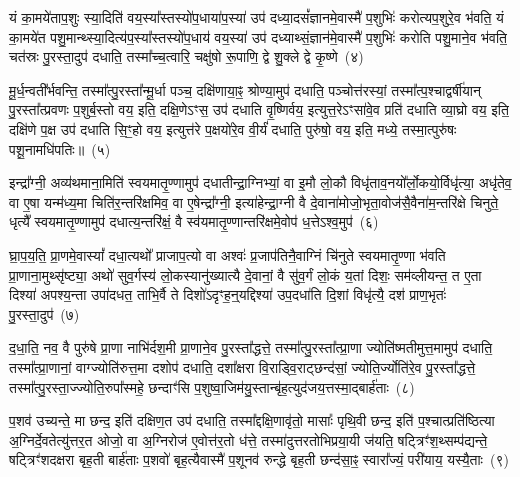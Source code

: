 यं का॒मये॑ताप॒शुः स्या॒दिति॑ वय॒स्या᳚स्तस्यो॑प॒धाया॑प॒स्या॑ उप॑ दध्या॒दसं᳚ज्ञानमे॒वास्मै॑ प॒शुभिः॑ करोत्यप॒शुरे॒व भ॑वति॒ यं का॒मये॑त पशु॒मान्थ्स्या॒दित्य॑प॒स्या᳚स्तस्यो॑प॒धाय॑ वय॒स्या॑ उप॑ दध्याथ्सं॒ज्ञान॑मे॒वास्मै॑ प॒शुभिः॑ करोति पशु॒माने॒व भ॑वति॒ चत॑स्रः पु॒रस्ता॒दुप॑ दधाति॒ तस्मा᳚च्च॒त्वारि॒ चक्षु॑षो रू॒पाणि॒ द्वे शु॒क्ले द्वे कृ॒ष्णे~(४)

मू॒र्ध॒न्वती᳚र्भवन्ति॒ तस्मा᳚त्पु॒रस्ता᳚न्मू॒र्धा पञ्च॒ दक्षि॑णाया॒ꣴ॒ श्रोण्या॒मुप॑ दधाति॒ पञ्चोत्त॑रस्यां॒ तस्मा᳚त्प॒श्चाद्वर्\mbox{}षी॑यान् पु॒रस्ता᳚त्प्रवणः प॒शुर्ब॒स्तो वय॒ इति॒ दक्षि॒णे\-ऽꣳस॒ उप॑ दधाति वृ॒ष्णिर्वय॒ इत्युत्त॒रे\-ऽꣳसा॑वे॒व प्रति॑ दधाति व्या॒घ्रो वय॒ इति॒ दक्षि॑णे प॒क्ष उप॑ दधाति सि॒ꣳ॒हो वय॒ इत्युत्त॑रे प॒क्षयो॑रे॒व वी॒र्यं॑ दधाति॒ पुरु॑षो॒ वय॒ इति॒ मध्ये॒ तस्मा॒त्पुरु॑षः पशू॒नामधि॑पतिः॥~(५)

{\anuvakamend[{कॢप्त्या॑ उप॒धाय॑ प्राण॒भृतः॒ सम॑नसः कृ॒ष्णे पुरु॑षो॒ वय॒ इति॒ पञ्च॑ च}]}%

इन्द्रा᳚ग्नी॒ अव्य॑थमाना॒मिति॑ स्वयमातृ॒ण्णामुप॑ दधातीन्द्रा॒ग्निभ्यां॒ वा इ॒मौ लो॒कौ विधृ॑ताव॒नयो᳚र्लो॒कयो॒र्विधृ॑त्या॒ अधृ॑तेव॒ वा ए॒षा यन्म॑ध्य॒मा चिति॑र॒न्तरि॑क्षमिव॒ वा ए॒षेन्द्रा᳚ग्नी॒ इत्या॑हेन्द्रा॒ग्नी वै दे॒वाना॑मोजो॒भृता॒वोज॑सै॒वैना॑\-म॒न्तरि॑क्षे चिनुते॒ धृत्यै᳚ स्वयमातृ॒ण्णामुप॑ दधात्य॒न्तरि॑क्षं॒ वै स्व॑यमातृ॒ण्णान्तरि॑क्षमे॒वोप॑ ध॒त्ते\-ऽश्व॒मुप॑~(६)

घ्रा॒प॒य॒ति॒ प्रा॒णमे॒वास्यां᳚ दधा॒त्यथो᳚ प्राजाप॒त्यो वा अश्वः॑ प्र॒जाप॑तिनै॒वाग्निं चि॑नुते स्वयमातृ॒ण्णा भ॑वति प्रा॒णाना॒मुथ्सृ॑ष्ट्या॒ अथो॑ सुव॒र्गस्य॑ लो॒कस्यानु॑ख्यात्यै दे॒वानां॒ वै सु॑व॒र्गं लो॒कं य॒तां दिशः॒ सम॑व्लीयन्त॒ त ए॒ता दिश्या॑ अपश्य॒न्ता उपा॑दधत॒ ताभि॒र्वै ते दिशो॑\-ऽदृꣳह॒न्॒यद्दिश्या॑ उप॒दधा॑ति दि॒शां विधृ॑त्यै॒ दश॑ प्राण॒भृतः॑ पु॒रस्ता॒दुप॑~(७)

द॒धा॒ति॒ नव॒ वै पुरु॑षे प्रा॒णा नाभि॑र्दश॒मी प्रा॒णाने॒व पु॒रस्ता᳚द्धत्ते॒ तस्मा᳚त्पु॒रस्ता᳚त्प्रा॒णा ज्योति॑ष्मतीमुत्त॒मामुप॑ दधाति॒ तस्मा᳚त्प्रा॒णानां॒ वाग्ज्योति॑रुत्त॒मा दशोप॑ दधाति॒ दशा᳚क्षरा वि॒राड्वि॒राट्छन्द॑सां॒ ज्योति॒र्ज्योति॑रे॒व पु॒रस्ता᳚द्धत्ते॒ तस्मा᳚त्पु॒रस्ता॒ज्ज्योति॒रुपा᳚स्महे॒ छन्दाꣳ॑सि प॒शुष्वा॒जिम॑यु॒स्तान्बृ॑ह॒त्युद॑जय॒त्तस्मा॒द्बार्\mbox{}ह॑ताः~(८)

प॒शव॑ उच्यन्ते॒ मा छन्द॒ इति॑ दक्षिण॒त उप॑ दधाति॒ तस्मा᳚द्दक्षि॒णावृ॑तो॒ मासाः᳚ पृथि॒वी छन्द॒ इति॑ प॒श्चात्प्रति॑ष्ठित्या अ॒ग्निर्दे॒वतेत्यु॑त्तर॒त ओजो॒ वा अ॒ग्निरोज॑ ए॒वोत्त॑र॒तो ध॑त्ते॒ तस्मा॑दुत्तरतोभिप्रया॒यी ज॑यति॒ षट्त्रिꣳ॑श॒थ्सम्प॑द्यन्ते॒ षट्त्रिꣳ॑शदक्षरा बृह॒ती बार्\mbox{}ह॑ताः प॒शवो॑ बृह॒त्यैवास्मै॑ प॒शूनव॑ रुन्द्धे बृह॒ती छन्द॑सा॒ꣴ॒ स्वारा᳚ज्यं॒ परी॑याय॒ यस्यै॒ताः~(९)

